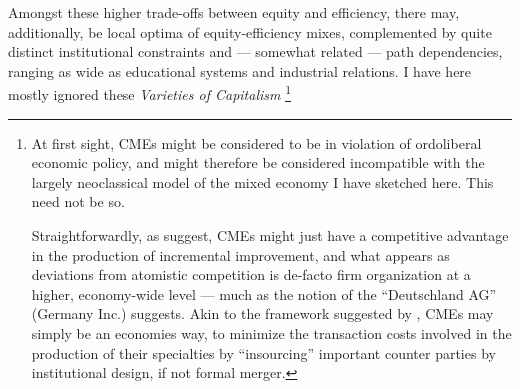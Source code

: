 \begin{enumerate}
	Amongst these higher trade-offs between equity and efficiency, there may, additionally, be local optima of equity-efficiency mixes, complemented by quite distinct institutional constraints and --- somewhat related --- path dependencies, ranging as wide as educational systems and industrial relations. I have here mostly ignored these \emph{Varieties of Capitalism} \citep{HallSoskice-2001-aa}\footnote{
		At first sight, \glspl{CME} might be considered to be in violation of ordoliberal economic policy, and might therefore be considered incompatible with the largely neoclassical model of the mixed economy I have sketched here. This need not be so. 
		
		Straightforwardly, as \citeauthor{HallSoskice-2001-aa} suggest, \glspl{CME} might just have a competitive advantage in the production of incremental improvement, and what appears as deviations from atomistic competition is de-facto firm organization at a higher, economy-wide level --- much as the notion of the ``Deutschland AG'' (Germany Inc.) suggests. Akin to the framework suggested by \cite{Hart1990}, \glspl{CME} may simply be an economies way, to minimize the transaction costs involved in the production of their specialties by ``insourcing'' important counter parties by institutional design, if not formal merger. 
		
}
\end{enumerate}
